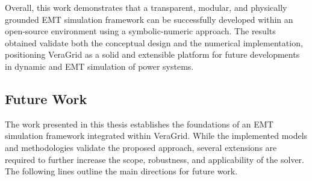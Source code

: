 Overall, this work demonstrates that a transparent, modular, and physically grounded EMT simulation framework 
can be successfully developed within an open-source environment using a symbolic-numeric approach. 
The results obtained validate both the conceptual design and the numerical implementation, positioning 
VeraGrid as a solid and extensible platform for future developments in dynamic and EMT simulation of power 
systems.

\subsection{Future Work}


The work presented in this thesis establishes the foundations of an EMT simulation framework integrated 
within VeraGrid. While the implemented models and methodologies validate the proposed approach, 
several extensions are required to further increase the scope, robustness, and applicability of the solver. 
The following lines outline the main directions for future work.

